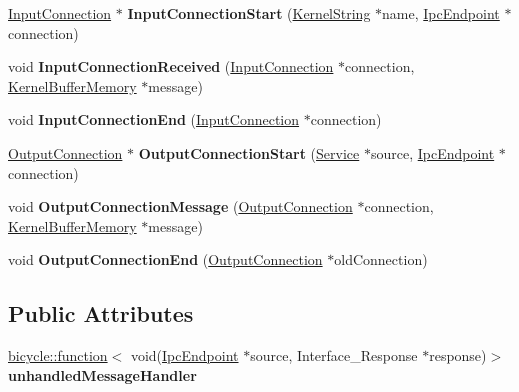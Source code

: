 \begin{DoxyCompactItemize}
\hyperlink{class_generic_provider_1_1_input_connection}{Input\+Connection} $\ast$ {\bfseries Input\+Connection\+Start} (\hyperlink{class_kernel_string}{Kernel\+String} $\ast$name, \hyperlink{class_ipc_endpoint}{Ipc\+Endpoint} $\ast$connection)
\item 
\mbox{\label{class_convenient_sink_a52b4a8b5242f06c4195450dff3365611}} 
void {\bfseries Input\+Connection\+Received} (\hyperlink{class_generic_provider_1_1_input_connection}{Input\+Connection} $\ast$connection, \hyperlink{class_kernel_buffer_memory}{Kernel\+Buffer\+Memory} $\ast$message)
\item 
\mbox{\label{class_convenient_sink_a74919945dec9902eaa20602c73eedc35}} 
void {\bfseries Input\+Connection\+End} (\hyperlink{class_generic_provider_1_1_input_connection}{Input\+Connection} $\ast$connection)
\item 
\mbox{\label{class_convenient_sink_ab3ffa0983b9097fb036e7e71454c6031}} 
\hyperlink{class_generic_provider_1_1_output_connection}{Output\+Connection} $\ast$ {\bfseries Output\+Connection\+Start} (\hyperlink{class_generic_provider_1_1_service}{Service} $\ast$source, \hyperlink{class_ipc_endpoint}{Ipc\+Endpoint} $\ast$connection)
\item 
\mbox{\label{class_convenient_sink_a0c94ca338f718ba8f50af1335531a247}} 
void {\bfseries Output\+Connection\+Message} (\hyperlink{class_generic_provider_1_1_output_connection}{Output\+Connection} $\ast$connection, \hyperlink{class_kernel_buffer_memory}{Kernel\+Buffer\+Memory} $\ast$message)
\item 
\mbox{\label{class_convenient_sink_a2b9e5bc821687d662c5abc075b26370f}} 
void {\bfseries Output\+Connection\+End} (\hyperlink{class_generic_provider_1_1_output_connection}{Output\+Connection} $\ast$old\+Connection)
\end{DoxyCompactItemize}
\subsection*{Public Attributes}
\begin{DoxyCompactItemize}
\item 
\mbox{\label{class_convenient_sink_aad6e8c2cb143aca7a193345c1ab6683f}} 
\hyperlink{classbicycle_1_1function}{bicycle\+::function}$<$ void(\hyperlink{class_ipc_endpoint}{Ipc\+Endpoint} $\ast$source, Interface\+\_\+\+Response $\ast$response)$>$ {\bfseries unhandled\+Message\+Handler}
\end{DoxyCompactItemize}
